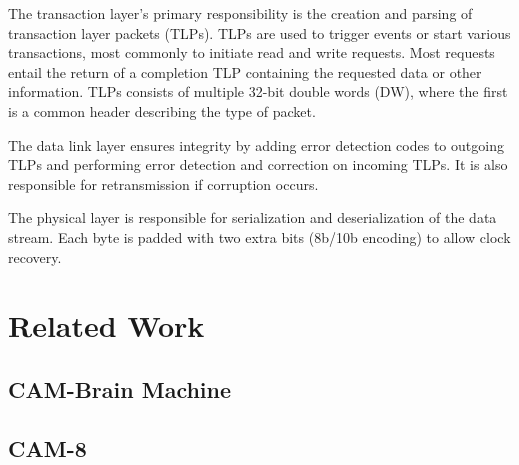 The transaction layer's primary responsibility is the creation and parsing of transaction layer packets (TLPs).
TLPs are used to trigger events or start various transactions, most commonly to initiate read and write requests\footnotemark.
Most requests entail the return of a completion TLP containing the requested data or other information.
TLPs consists of multiple 32-bit double words (DW), where the first is a common header describing the type of packet.

The data link layer ensures integrity by adding error detection codes to outgoing TLPs and performing error detection and correction on incoming TLPs.
It is also responsible for retransmission if corruption occurs.

The physical layer is responsible for serialization and deserialization of the data stream.
Each byte is padded with two extra bits (8b/10b encoding) to allow clock recovery.

\section{Related Work}

\TODO

\subsection{CAM-Brain Machine}

\TODO

\subsection{CAM-8}

\TODO
